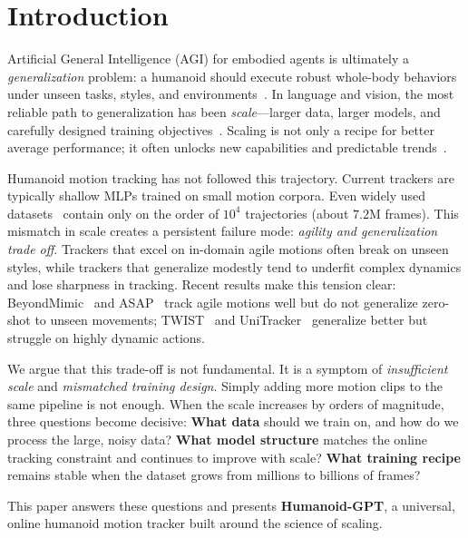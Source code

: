 \section{Introduction}
\label{sec:intro}

Artificial General Intelligence (AGI) for embodied agents is ultimately a \emph{generalization} problem: a humanoid should execute robust whole-body behaviors under unseen tasks, styles, and environments~\cite{ChatGPT22,GPT3_20,GPT4o24,gpt_o1}. In language and vision, the most reliable path to generalization has been \emph{scale}---larger data, larger models, and carefully designed training objectives~\cite{ChatGPT22,InstructGPT22,gemini23,gpt_o1,LLaMA23,CLIP21,SAM23}. Scaling is not only a recipe for better average performance; it often unlocks new capabilities and predictable trends~\cite{emergent22}.

Humanoid motion tracking has not followed this trajectory. Current trackers are typically shallow MLPs trained on small motion corpora. Even widely used datasets~\cite{amass19,lafan20,omomo23} contain only on the order of $10^4$ trajectories (about $7.2$M frames). This mismatch in scale creates a persistent failure mode: \emph{agility and generalization trade off}. Trackers that excel on in-domain agile motions often break on unseen styles, while trackers that generalize modestly tend to underfit complex dynamics and lose sharpness in tracking. Recent results make this tension clear: BeyondMimic~\cite{beyondmimic25} and ASAP~\cite{asap25} track agile motions well but do not generalize zero-shot to unseen movements; TWIST~\cite{twist25} and UniTracker~\cite{unitracker25} generalize better but struggle on highly dynamic actions.

We argue that this trade-off is not fundamental. It is a symptom of \emph{insufficient scale} and \emph{mismatched training design}. Simply adding more motion clips to the same pipeline is not enough. When the scale increases by orders of magnitude, three questions become decisive:
 \textbf{What data} should we train on, and how do we process the large, noisy data?
 \textbf{What model structure} matches the online tracking constraint and continues to improve with scale?
 \textbf{What training recipe} remains stable when the dataset grows from millions to billions of frames?

This paper answers these questions and presents \textbf{Humanoid-GPT}, a universal, online humanoid motion tracker built around the science of scaling.


